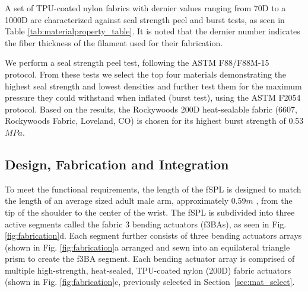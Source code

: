 \documentclass[letterpaper, 10 pt, conference]{ieeeconf}  %
\begin{document}
A set of TPU-coated nylon fabrics with dernier values ranging from 70D to a 1000D are characterized against seal strength peel and burst tests, as seen in Table \ref{tab:materialproperty_table}. It is noted that the dernier number indicates the fiber thickness of the filament used for their fabrication.

	We perform a seal strength peel test, following the ASTM F88/F88M-15 protocol. From these tests we select the top four materials demonstrating the highest seal strength and lowest densities and further test them for the maximum pressure they could withstand when inflated (burst test), using the ASTM F2054 protocol. Based on the results, the Rockywoods 200D heat-sealable fabric (6607, Rockywoods Fabric, Loveland, CO) is chosen for its highest burst strength of 0.53$MPa$. 

% 
% 
% 



\subsection{Design, Fabrication and Integration}
To meet the functional requirements, the length of the fSPL is designed to match the length of an average sized adult male arm, approximately 0.59$m$ \cite{plagenhoef1983}, from the tip of the shoulder to the center of the wrist. The fSPL is subdivided into three active segments called the fabric 3 bending actuators (f3BAs), as seen in Fig. \ref{fig:fabrication}d. Each segment further consists of three bending actuators arrays (shown in Fig. \ref{fig:fabrication}a arranged and sewn into an equilateral triangle prism to create the f3BA segment. %
Each bending actuator array is comprised of multiple high-strength, heat-sealed, TPU-coated nylon (200D) fabric actuators (shown in Fig. \ref{fig:fabrication}c, previously selected in Section~\ref{sec:mat_select}. 
% 
\end{document}
